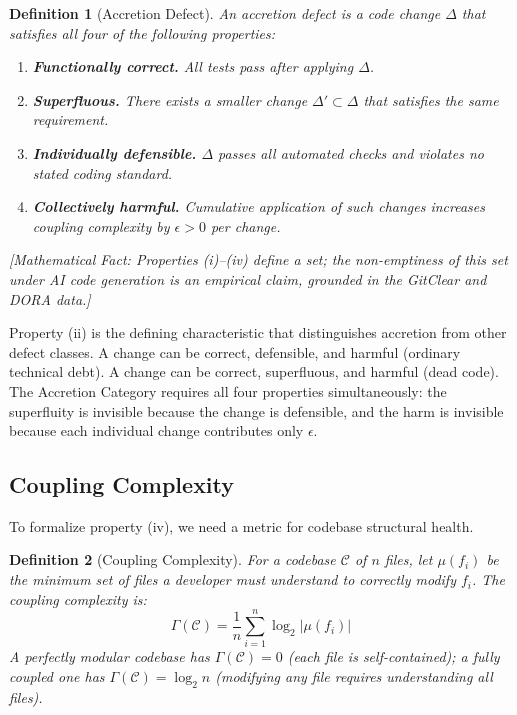 \documentclass[11pt, a4paper, logo, copyright]{googledeepmind}
\newtheorem{definition}{Definition}[section]
\begin{document}
\begin{definition}[Accretion Defect]
\label{def:accretion}
An \emph{accretion defect} is a code change $\Delta$ that satisfies all four of the following properties:
\begin{enumerate}[nosep]
    \item \textbf{Functionally correct.} All tests pass after applying $\Delta$.
    \item \textbf{Superfluous.} There exists a smaller change $\Delta' \subset \Delta$ that satisfies the same requirement.
    \item \textbf{Individually defensible.} $\Delta$ passes all automated checks and violates no stated coding standard.
    \item \textbf{Collectively harmful.} Cumulative application of such changes increases coupling complexity by $\epsilon > 0$ per change.
\end{enumerate}
\end{definition}

\emph{[Mathematical Fact: Properties (i)--(iv) define a set; the non-emptiness of this set under AI code generation is an empirical claim, grounded in the GitClear and DORA data.]}

Property (ii) is the defining characteristic that distinguishes accretion from other defect classes. A change can be correct, defensible, and harmful (ordinary technical debt). A change can be correct, superfluous, and harmful (dead code). The Accretion Category requires all four properties simultaneously: the superfluity is invisible because the change is defensible, and the harm is invisible because each individual change contributes only $\epsilon$.

\subsection{Coupling Complexity}

To formalize property (iv), we need a metric for codebase structural health.

\begin{definition}[Coupling Complexity]
\label{def:coupling-complexity}
For a codebase $\mathcal{C}$ of $n$ files, let $\mu(f_i)$ be the minimum set of files a developer must understand to correctly modify $f_i$. The \emph{coupling complexity} is:
\begin{equation}
\Gamma(\mathcal{C}) = \frac{1}{n} \sum_{i=1}^{n} \log_2 |\mu(f_i)|
\end{equation}
A perfectly modular codebase has $\Gamma(\mathcal{C}) = 0$ (each file is self-contained); a fully coupled one has $\Gamma(\mathcal{C}) = \log_2 n$ (modifying any file requires understanding all files).
\end{definition}
\end{document}
